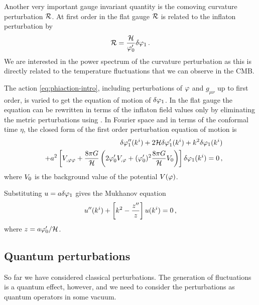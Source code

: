 Another very important gauge invariant quantity is the comoving curvature
perturbation $\mathcal{R}$. At first order in the flat gauge $\mathcal{R}$ is related to the
inflaton perturbation by \cite{Malik:2008im}
% 
\begin{equation}
\label{eq:flatRdefn-intro}
 \mathcal{R} = \frac{\mathcal{H}}{\varphi_0'}\delta\varphi_{1}\,.
\end{equation}
% 
We are interested in the power spectrum of the curvature perturbation as this
is directly related to the temperature fluctuations that we can observe in the
CMB. 

The action \eqref{eq:phiaction-intro},
including perturbations of $\varphi$ and $g_{\mu\nu}$ up to first order, is
varied to get the equation of motion of $\delta\varphi_{1}$. 
In the flat gauge the equation can be rewritten in terms of the inflaton field
values only by eliminating the metric perturbations using
. 
% 
In Fourier space and in terms of the conformal time $\eta$, the closed form of
the first order perturbation equation of motion is \cite{Malik:2008im}
% 
\begin{eqnarray}
\label{eq:fokg-intro}
&& \delta\varphi_{1}''(k^i) + 2\mathcal{H} \delta\varphi_{1}'(k^i) + k^2\delta\varphi_{1}(k^i) \nonumber\\
&&+ a^2 \left[V_{,\varphi\varphi} +
\frac{8\pi G}{\mathcal{H}}\left(2\varphi_{0}' V_{,\varphi} + (\varphi_{0}')^2\frac{8\pi G
}{\mathcal{H}}V_{0}\right)\right]\delta\varphi_{1}(k^i) = 0 \,,
\end{eqnarray}
% 
where $V_{0}$ is the background value of the potential $V(\varphi)$.
%


Substituting $u=a\delta\varphi_{1}$ gives the Mukhanov equation \cite{Mukhanov:1990me}
% 
\begin{equation}
 \label{eq:ueq-intro}
 u''(k^i) + \left[ k^2 -\frac{z''}{z}\right]u(k^i) = 0\,,
\end{equation}
% 
where $z= a\varphi_0'/\mathcal{H}$.

\subsection{Quantum perturbations}
So far we have considered classical perturbations. The generation of
fluctuations is a quantum effect, however, and we need to consider the
perturbations as quantum operators in some vacuum. 

